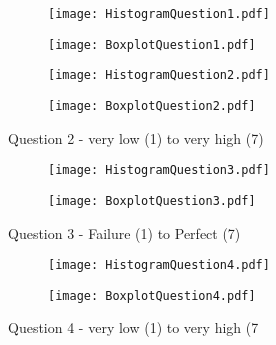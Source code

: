 \begin{figure}[!ht] %
\centering
  \caption[Question 1 - Histogram and Box plot]{Question 1 - very low (1) to very high (7)}
    \label{Question1}  
\begin{subfigure} 
\centering
\texttt{[image: HistogramQuestion1.pdf]}
\end{subfigure} 
\begin{subfigure} 
\centering
\texttt{[image: BoxplotQuestion1.pdf]}
\end{subfigure}
\end{figure}
\begin{figure}[H] %
\begin{center} 
\begin{subfigure} 
\centering
\texttt{[image: HistogramQuestion2.pdf]}
\end{subfigure} 
\begin{subfigure} 
\centering
\texttt{[image: BoxplotQuestion2.pdf]}
\end{subfigure}
  \caption[Question 2 - Histogram and Box plot]{Question 2 - very low (1) to very high (7)}
    \label{Question2} 
\end{center}
\end{figure}
\begin{figure}[htbp] %
\begin{center} 
\begin{subfigure} 
\centering
\texttt{[image: HistogramQuestion3.pdf]}
\end{subfigure} 
\begin{subfigure} 
\centering
\texttt{[image: BoxplotQuestion3.pdf]}
\end{subfigure}
  \caption[Question 3 - Histogram and Box plot]{Question 3 - Failure (1) to Perfect (7)}
    \label{Question3} 
\end{center}
\end{figure}
\begin{figure}[htbp] %
\begin{center} 
\begin{subfigure} 
\centering
\texttt{[image: HistogramQuestion4.pdf]}
\end{subfigure} 
\begin{subfigure} 
\centering
\texttt{[image: BoxplotQuestion4.pdf]}
\end{subfigure}
  \caption[Question 4 - Histogram and Box plot]{Question 4 - very low (1) to very high (7}
    \label{Question4} 
\end{center}
\end{figure}
